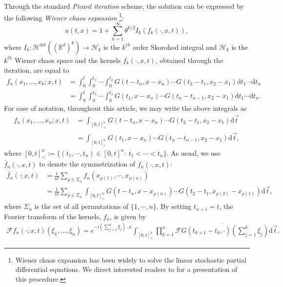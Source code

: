 \documentclass[a4paper,11pt]{article}
\numberwithin{equation}{section}
\numberwithin{equation}{section}
\theoremstyle{plain}
\theoremstyle{definition}
\newcommand{\ud}{\ensuremath{\mathrm{d} }}
\newcommand{\R}{\mathbb{R}}
\begin{document}
Through the standard {\it Picard iteration} scheme, the solution can be expressed by the following
{\it Wiener chaos expansion} \footnote{Wiener chaos expansion has been widely to solve the linear
  stochastic partial differential equations. We direct interested readers to \cite[Section
  5]{BS2017} for a presentation of this procedure.}:
\begin{equation} \label{E:solwexp}
  u(t,x) = 1 + \sum_{k=1}^\infty \theta^{k/2}I_k(f_k(\cdot,x,t)),
\end{equation}
where $I_k : \mathcal{H}^{\otimes k}\left((\R^d)^k\right) \to \mathcal{H}_k$ is the $k^{th}$ order
Skorohod integral and $\mathcal{H}_k$ is the $k^{th}$ Wiener chaos space and the kernels
$f_k(\cdot,x,t)$, obtained through the iteration, are equal to
\begin{align*}
  f_n(x_1,...,x_k;x,t)
  & = \int_0^t \int_0^{t_n}\cdots \int_0^{t_2} G(t-t_n,x-x_n)\cdots G(t_2-t_1,x_2-x_1) \ud t_1\cdots \ud t_n \\
  & = \int_0^t \int_0^{t_n}\cdots \int_0^{t_2} G(t_1,x-x_n)\cdots G(t_n-t_{n-1},x_2-x_1) \ud t_1\cdots \ud t_n. \nonumber
\end{align*}
For ease of notation, throughout this article, we may write the above integrals as
\begin{align*}
  f_n(x_1,...,x_n;x,t)
  & = \int_{[0,t]^n_<} G(t-t_n,x-x_n)\cdots G(t_2-t_1,x_2-x_1) \ud \vec{t} \\
  & = \int_{[0,t]^n_<}G(t_1,x-x_n)\cdots G(t_n-t_{n-1},x_2-x_1) \ud \vec{t},
\end{align*}
where $[0,t]_<^n:=\{(t_1,\cdots,t_n)\in [0,t]^n:\: t_1<\cdots < t_n\}$. As usual, we use
$\widetilde{f_n}(\cdot, x, t)$ to denote the symmetrization of $f_n(\cdot,x,t)$:
  \begin{align*}
    \widetilde{f_n}(\cdot; x, t)
    & = \frac{1}{n!} \sum_{\rho \in \Sigma_n} f_n\left(x_{\rho(1)},\cdots, x_{\rho(n)}\right) \\
    & = \frac{1}{n!} \sum_{\rho \in \Sigma_n} \int_{[0,t]^n_<} G\left(t-t_n,x-x_{\rho(n)}\right)\cdots G\left(t_2-t_1,x_{\rho(2)}-x_{\rho(1)}\right) \ud \vec{t},
  \end{align*}
where $\Sigma_n$ is the set of all permutations of $\{1,\cdots,n\} $.
By setting $t_{n+1}=t$, the Fourier transform of the kernels, $f_n$, is given by
\begin{align} \label{E:fweker}
  \mathcal{F}f_n(\cdot;x,t)(\xi_1,...,\xi_n)
  = e^{-i \left(\sum_{j=1}^n \xi_j \right) \cdot x} \int_{[0,t]^n_<}
  \prod_{k=1}^n \overline{\mathcal{F}G(t_{k+1}-t_k,\cdot)\left(\sum_{j=1}^k \xi_j\right) } \ud \vec{t}.
\end{align}
\end{document}
